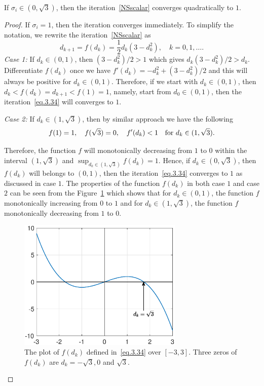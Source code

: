 \begin{lemma}\label{lemma.scalarNS}
    If $\sigma_i\in (0,\sqrt{3})$, then the iteration~\eqref{NSscalar} converges quadratically to $1$.
\end{lemma}

\begin{proof}
    If $\sigma_i = 1$, then the iteration converges immediately. To simplify the notation, we rewrite the iteration~\eqref{NSscalar} as 
    \begin{equation}\label{eq.3.34}
        d_{k+1} = f(d_k) = \frac 12 d_k(3-d_k^2),\quad k = 0,1,\dots.
    \end{equation}
    \quad \textit{Case 1:} If $d_k\in (0,1)$, then $(3-d_k^2)/2 > 1$ which gives $d_k(3-d_k^2)/2 > d_k$. Differentiate $f(d_k)$ once we have $f'(d_k) = -d_k^2 +(3-d_k^2)/2$ and this will always be positive for $d_k\in(0,1)$. Therefore, if we start with $d_k\in (0,1)$, then $d_k < f(d_k) = d_{k+1} < f(1) = 1$, namely, start from $d_0 \in (0,1)$, then the iteration~\eqref{eq.3.34} will converges to $1$.

    \quad \textit{Case 2:} If $d_k\in (1,\sqrt{3})$, then by similar approach we have the following
    \begin{equation}\notag
        f(1) = 1,\quad f(\sqrt{3}) = 0,\quad f'(d_k) <1 \quad \text{for $d_k\in(1,\sqrt{3})$.}
    \end{equation}
    
    Therefore, the function $f$ will monotonically decreasing from $1$ to $0$ within the interval $(1,\sqrt{3})$ and $\sup_{d_k\in(1,\sqrt{3})}f(d_k) = 1$. Hence, if $d_k \in (0,\sqrt{3})$, then $f(d_k)$ will belongs to $(0,1)$, then the iteration~\eqref{eq.3.34} converges to $1$ as discussed in case $1$. The properties of the function $f(d_k)$ in both case $1$ and case $2$ can be seen from the Figure~\ref{fig:11} which shows that for $d_{k}\in (0,1)$, the function $f$ monotonically increasing from $0$ to $1$ and for $d_k\in(1,\sqrt{3})$, the function $f$ monotonically decreasing from $1$ to $0$.

    \begin{figure}[ht]
        \centering 
        \includegraphics[width=0.7\textwidth]{figs/newton-schulz-scalar.eps}
        \caption[The plot of $f(d_k)$ defined in~\eqref{eq.3.34}.]{The plot of $f(d_k)$ defined in~\eqref{eq.3.34} over $[-3,3]$. Three zeros of $f(d_k)$ are $d_k = -\sqrt{3},0$ and $\sqrt{3}$.}
        \label{fig:11}
    \end{figure}


\end{proof}
